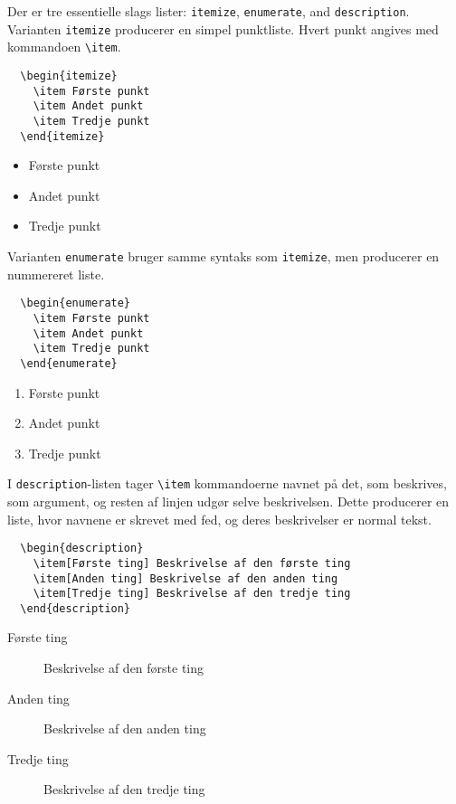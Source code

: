 Der er tre essentielle slags lister: \texttt{itemize}, \texttt{enumerate}, and \texttt{description}.
Varianten \texttt{itemize} producerer en simpel punktliste.
Hvert punkt angives med kommandoen \verb!\item!.
%
\begin{verbatim}
  \begin{itemize}
    \item Første punkt 
    \item Andet punkt
    \item Tredje punkt
  \end{itemize}
\end{verbatim}
%
\begin{itemize}
\item Første punkt 
\item Andet punkt
\item Tredje punkt
\end{itemize}
%
Varianten \texttt{enumerate} bruger samme syntaks som \texttt{itemize}, men producerer en nummereret liste.
%
\begin{verbatim}
  \begin{enumerate}
    \item Første punkt 
    \item Andet punkt
    \item Tredje punkt
  \end{enumerate}
\end{verbatim}
%
\begin{enumerate}
\item Første punkt 
\item Andet punkt
\item Tredje punkt
\end{enumerate}
%
I \texttt{description}-listen tager \verb!\item! kommandoerne navnet på det, som beskrives, som argument, og resten af linjen udgør selve beskrivelsen.
Dette producerer en liste, hvor navnene er skrevet med fed, og deres beskrivelser er normal tekst.
%
\begin{verbatim}
  \begin{description}
    \item[Første ting] Beskrivelse af den første ting
    \item[Anden ting] Beskrivelse af den anden ting
    \item[Tredje ting] Beskrivelse af den tredje ting
  \end{description}
\end{verbatim}
%
\begin{description}
\item[Første ting] Beskrivelse af den første ting
\item[Anden ting] Beskrivelse af den anden ting
\item[Tredje ting] Beskrivelse af den tredje ting
\end{description}


